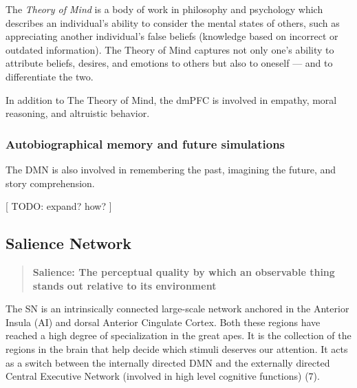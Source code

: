 \documentclass[twocolumn]{article}
\begin{document}
The \textit{Theory of Mind} is a body of work in philosophy and psychology which
describes an individual's ability to consider the mental states of others, such as
appreciating another individual's false beliefs (knowledge based on incorrect or
outdated information). The Theory of Mind captures not only one's ability to
attribute beliefs, desires, and emotions to others but also to oneself --- and to
differentiate the two. \cite{autistictheoryofmind}

In addition to The Theory of Mind, the dmPFC is involved in empathy, moral reasoning,
and altruistic behavior. \cite{defaultnetworkadaptive,dmpfcothers,dmpfcaltruism}

\subsubsection{Autobiographical memory and future simulations}

The DMN is also involved in remembering the past, imagining the future, and story
comprehension. \cite{defaultnetworkadaptive}

[ TODO: expand? how? ]

\subsection{Salience Network}

\begin{quote}
  \textbf{Salience: The perceptual quality by which an observable thing stands out
    relative to its environment}
\end{quote}

The SN is an intrinsically connected large-scale network anchored in the Anterior Insula (AI) and dorsal Anterior Cingulate Cortex. Both these regions have reached a high degree of specialization in the great apes. It is the collection of the regions in the brain that help decide which stimuli deserves our attention. It acts as a switch between the internally directed DMN and the externally directed Central Executive Network (involved in high level cognitive functions) (7).
\end{document}
